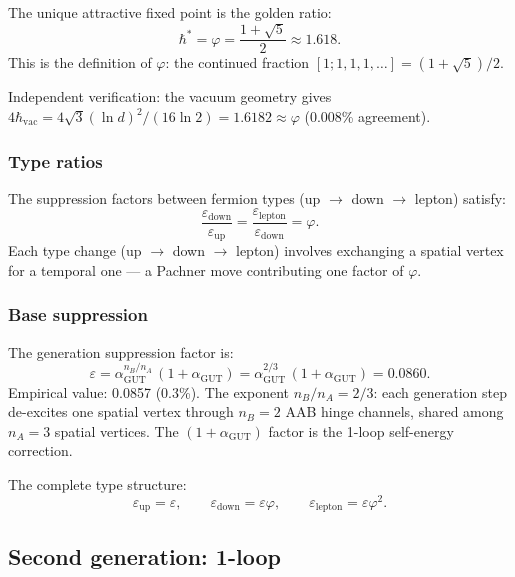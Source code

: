 \documentclass[12pt]{article}
\theoremstyle{remark}
\theoremstyle{definition}
\begin{document}
The unique attractive fixed point is the golden ratio:
\begin{equation}
\hbar^* = \varphi = \frac{1 + \sqrt{5}}{2} \approx 1.618.
\end{equation}
This is the definition of $\varphi$: the continued fraction $[1; 1, 1, 1, \ldots] = (1+\sqrt{5})/2$.

Independent verification: the vacuum geometry gives $4\hbar_\text{vac} = 4\sqrt{3}(\ln d)^2/(16\ln 2) = 1.6182 \approx \varphi$ (0.008\% agreement).

\subsubsection{Type ratios}

The suppression factors between fermion types (up $\to$ down $\to$ lepton) satisfy:
\begin{equation}
\frac{\varepsilon_\text{down}}{\varepsilon_\text{up}} = \frac{\varepsilon_\text{lepton}}{\varepsilon_\text{down}} = \varphi.
\end{equation}
Each type change (up $\to$ down $\to$ lepton) involves exchanging a spatial vertex for a temporal one --- a Pachner move contributing one factor of $\varphi$.

\subsubsection{Base suppression}

The generation suppression factor is:
\begin{equation}
\varepsilon = \alpha_\text{GUT}^{n_B/n_A}\,(1 + \alpha_\text{GUT}) = \alpha_\text{GUT}^{2/3}\,(1 + \alpha_\text{GUT}) = 0.0860.
\end{equation}
Empirical value: 0.0857 (0.3\%). The exponent $n_B/n_A = 2/3$: each generation step de-excites one spatial vertex through $n_B = 2$ AAB hinge channels, shared among $n_A = 3$ spatial vertices. The $(1 + \alpha_\text{GUT})$ factor is the 1-loop self-energy correction.

The complete type structure:
\begin{equation}
\varepsilon_\text{up} = \varepsilon, \qquad \varepsilon_\text{down} = \varepsilon\varphi, \qquad \varepsilon_\text{lepton} = \varepsilon\varphi^2.
\end{equation}

\subsection{Second generation: 1-loop}
\end{document}
